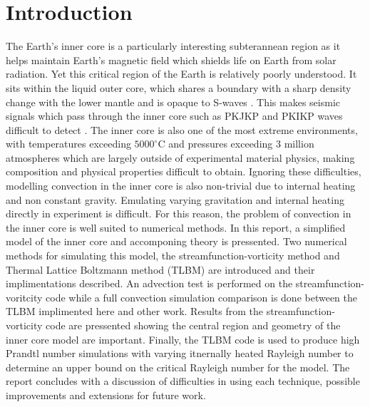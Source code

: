 \documentclass{article}
\begin{document}
\section*{Introduction}
The Earth's inner core is a particularly interesting subterannean region as it helps maintain Earth's magnetic field which shields life on Earth from
solar 
radiation. Yet this critical region of the Earth is relatively poorly understood. It sits within the liquid outer core, which shares a boundary with a sharp 
density change with the lower mantle and is opaque to S-waves \cite{fowler1990solid}. This makes seismic signals which pass through the inner core such 
as PKJKP and PKIKP waves difficult to detect \cite{tkalvcic2018shear, bolt1970pdp}. The inner core is also one of the most extreme environments, with 
temperatures exceeding $5000^{\circ}$C and pressures exceeding 3 million atmospheres which are 
largely outside of experimental material physics, making composition and physical properties difficult to obtain. Ignoring these difficulties, modelling 
convection in the inner core is also non-trivial due to internal heating and non constant gravity. Emulating varying gravitation and internal heating 
directly in experiment is difficult. For this reason, the problem of convection in the inner core is well suited to numerical methods. 
\newline
In this report, a simplified model of the inner core and accomponing theory is pressented. Two numerical methods for simulating this model, the streamfunction-vorticity method and Thermal Lattice Boltzmann method (TLBM) are introduced
and their implimentations described. An advection test is performed on the streamfunction-voritcity code while a full convection simulation comparison is done between the TLBM 
implimented here and other work. Results from the streamfunction-vorticity code are pressented showing the central region and geometry of the inner core model are important.
Finally, the TLBM code is used to produce high Prandtl number simulations with varying itnernally heated Rayleigh number to determine an upper bound on the critical Rayleigh number
for the model. The report concludes with a discussion of difficulties in using each technique, possible improvements and extensions for future work.

\end{document}
